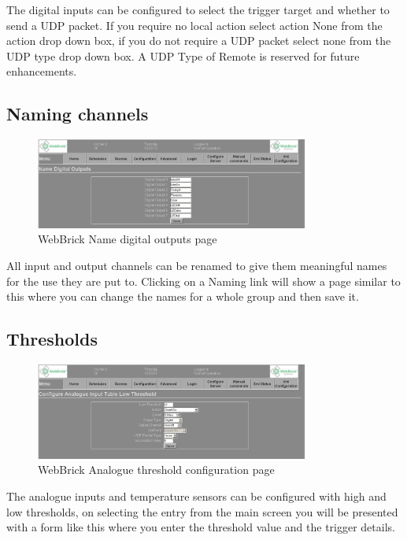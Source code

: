 The digital inputs can be configured to select the trigger target and whether to send a UDP packet. 
If you require no local action select action None from the action drop down box, 
if you do not require a UDP packet select none from the UDP type drop down box. 
A UDP Type of Remote is reserved for future enhancements.

\subsection{Naming channels}

\begin{figure}[H]
\centering
\includegraphics[width=0.8\textwidth]{Images/NameDigitalOut.png}
\caption{WebBrick Name digital outputs page}
\end{figure}

All input and output channels can be renamed to give them meaningful names for the use they are put to. 
Clicking on a Naming link will show a page similar to this where you can change the names for a whole group and then save it.

\subsection{Thresholds}

\begin{figure}[H]
\centering
\includegraphics[width=0.8\textwidth]{Images/AnalogueThresh.png}
\caption{WebBrick Analogue threshold configuration page}
\end{figure}

The analogue inputs and temperature sensors can be configured with high and low thresholds, on selecting the entry from the main screen you will be presented with a form like this where you enter the threshold value and the trigger details.

